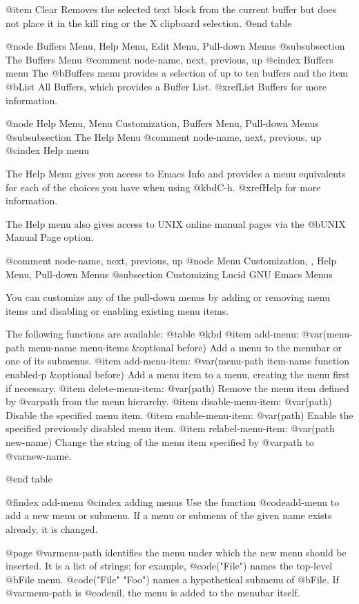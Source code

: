 {{@item Clear
Removes the selected text block from the current buffer but does not
place it in the kill ring or the X clipboard selection. 
@end table

@node Buffers Menu, Help Menu, Edit Menu, Pull-down Menus
@subsubsection The Buffers Menu
@comment  node-name,  next,  previous,  up
@cindex Buffers menu
The @b{Buffers} menu provides a selection of up to ten buffers and the
item @b{List All Buffers}, which provides a Buffer List. @xref{List
Buffers} for more information.  

@node Help Menu, Menu Customization, Buffers Menu, Pull-down Menus
@subsubsection The Help Menu
@comment  node-name,  next,  previous,  up
@cindex Help menu

The Help Menu gives you access to Emacs Info and provides a menu
equivalents for each of the choices you have when using @kbd{C-h}. 
@xref{Help} for more information. 

The Help menu also gives access to UNIX online manual pages via the
@b{UNIX Manual Page} option.  

@comment  node-name,  next,  previous,  up
@node Menu Customization, , Help Menu, Pull-down Menus
@subsection Customizing Lucid GNU Emacs Menus

You can customize any of the pull-down menus by adding or removing menu
items and disabling or enabling existing menu items.
 
The following functions are available: 
@table @kbd
@item add-menu: @var{(menu-path menu-name menu-items &optional before)}
Add a menu to the menubar or one of its submenus.
@item add-menu-item: @var{(menu-path item-name function enabled-p &optional before)}
Add a menu item to a menu, creating the menu first if necessary.
@item delete-menu-item: @var{(path)}
Remove the menu item defined by @var{path} from the menu hierarchy.
@item disable-menu-item: @var{(path)}
Disable the specified menu item.
@item enable-menu-item: @var{(path)}
Enable the specified previously disabled menu item.
@item relabel-menu-item: @var{(path new-name)}
Change the string of the menu item specified by @var{path} to
@var{new-name}.

@end table

@findex add-menu
@cindex adding menus
Use the function @code{add-menu} to add a new menu or submenu.
If a menu or submenu of the given name exists already, it is changed.

@page
@var{menu-path} identifies the menu under which the new menu should be
inserted.  It is a list of strings; for example, @code{("File")} names
the top-level @b{File} menu.  @code{("File" "Foo")} names a hypothetical
submenu of @b{File}.  If @var{menu-path} is @code{nil}, the menu is
added to the menubar itself.

}}
